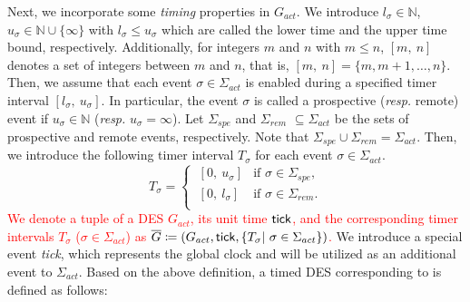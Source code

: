 \documentclass[journal,twoside,web]{IEEEtran}
\newcommand{\tick}{{\sf tick}}
\newcommand{\red}[1]{\textcolor{red}{#1}}
\begin{document}
Next, we incorporate some \textit{timing} properties in $G_{act}$. 
We introduce $l_{\sigma} \in \mathbb{N}$, $u_{\sigma} \in  \mathbb{N} \cup \{\infty\}$ with  $l_{\sigma} \leq u_{\sigma}$ which are called the lower time and the upper time bound, respectively.
Additionally, for integers $m$ and $n$ with $m \leq n$, $[m,\ n]$ denotes a set of integers between $m$ and $n$, that is, $[m,\ n]=\{ m, m+1, \ldots , n\}$.
Then, we assume that each event $\sigma \in \Sigma_{act}$ is enabled during a specified timer interval $[ l_{\sigma},\ u_{\sigma}]$.
%
In particular, the event $\sigma$ is called a prospective ({\sl resp.} remote) event if $u_{\sigma} \in \mathbb{N}$ ({\sl resp.} $u_{\sigma} = \infty$). 
Let $\Sigma_{spe}$ and $\Sigma_{rem}$ $\subseteq \Sigma_{act}$ be the sets of prospective and remote events, respectively.  Note that $\Sigma_{spe} \cup \Sigma_{rem} = \Sigma_{act}$.
Then, we introduce the following timer interval $T_{\sigma}$ for each event $\sigma \in \Sigma_{act}$.
\begin{equation}
\label{T_sigma}
T_{\sigma}= \left\{
\begin{array}{ll}  
\ [ 0,\ u_{\sigma} ]  & \mbox{if } \sigma \in \Sigma_{spe}, \\
\ [ 0,\ l_{\sigma} ] & \mbox{if } \sigma \in \Sigma_{rem}. \\
\end{array} \right.
\end{equation}	 
%
\red{We denote a tuple of a DES $G_{act}$, its unit time $\tick$, and the corresponding timer intervals $T_{\sigma}$ ($\sigma\in \Sigma_{act}$) as $\overline{G}\coloneqq (G_{act},{\tick},\{T_{\sigma} |~\sigma\in \Sigma_{act} \})$.}
We introduce a special event \textit{tick}, which represents the global clock and will be utilized as an additional event to $\Sigma_{act}$. 
Based on the above definition, a timed DES corresponding to  is defined as follows: 
\end{document}
